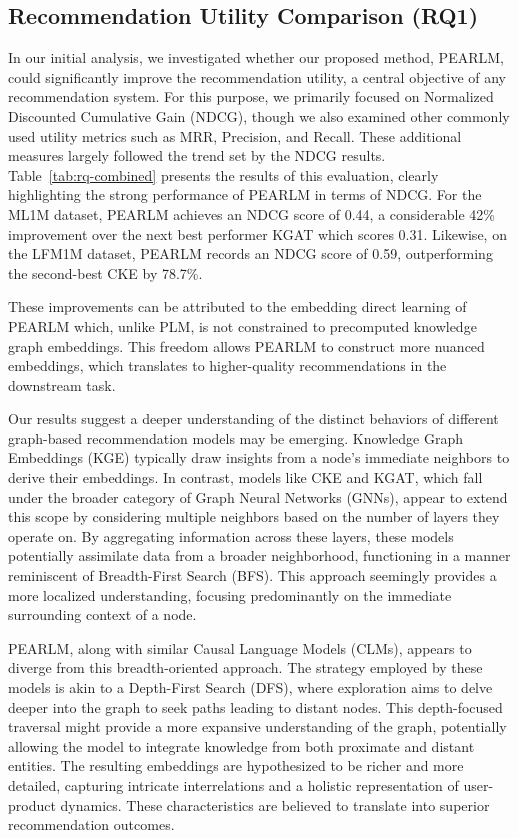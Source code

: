 \documentclass[sigconf]{acmart}
\begin{document}
\subsection{Recommendation Utility Comparison (RQ1)}
\label{sec:rq1}
In our initial analysis, we investigated whether our proposed method, PEARLM, could significantly improve the recommendation utility, a central objective of any recommendation system. For this purpose, we primarily focused on Normalized Discounted Cumulative Gain (NDCG), though we also examined other commonly used utility metrics such as MRR, Precision, and Recall. These additional measures largely followed the trend set by the NDCG results.\\
Table~\ref{tab:rq-combined} presents the results of this evaluation, clearly highlighting the strong performance of PEARLM in terms of NDCG. For the ML1M dataset, PEARLM achieves an NDCG score of 0.44, a considerable 42\% improvement over the next best performer KGAT which scores 0.31. Likewise, on the LFM1M dataset, PEARLM records an NDCG score of 0.59, outperforming the second-best CKE by 78.7\%.

These improvements can be attributed to the embedding direct learning of PEARLM which, unlike PLM, is not constrained to precomputed knowledge graph embeddings. This freedom allows PEARLM to construct more nuanced embeddings, which translates to higher-quality recommendations in the downstream task. 

Our results suggest a deeper understanding of the distinct behaviors of different graph-based recommendation models may be emerging. Knowledge Graph Embeddings (KGE) typically draw insights from a node's immediate neighbors to derive their embeddings. In contrast, models like CKE and KGAT, which fall under the broader category of Graph Neural Networks (GNNs), appear to extend this scope by considering multiple neighbors based on the number of layers they operate on. By aggregating information across these layers, these models potentially assimilate data from a broader neighborhood, functioning in a manner reminiscent of Breadth-First Search (BFS). This approach seemingly provides a more localized understanding, focusing predominantly on the immediate surrounding context of a node.

PEARLM, along with similar Causal Language Models (CLMs), appears to diverge from this breadth-oriented approach. The strategy employed by these models is akin to a Depth-First Search (DFS), where exploration aims to delve deeper into the graph to seek paths leading to distant nodes. This depth-focused traversal might provide a more expansive understanding of the graph, potentially allowing the model to integrate knowledge from both proximate and distant entities. The resulting embeddings are hypothesized to be richer and more detailed, capturing intricate interrelations and a holistic representation of user-product dynamics. These characteristics are believed to translate into superior recommendation outcomes.
\end{document}
